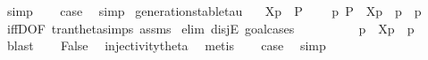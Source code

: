 \begin{isabellebody}
\ simp\isanewline
\ \ \isamarkupfalse%
\ {\isacharquery}{\kern0pt}case\ \isamarkupfalse%
\ simp\isanewline
{}\isamarkupfalse%
%
\endisatagproof
{\isafoldproof}%
%
\isadelimproof
\isanewline
%
\endisadelimproof
\isanewline
{}\isamarkupfalse%
\ generation{\isacharunderscore}{\kern0pt}stable{\isacharunderscore}{\kern0pt}tau{\isacharcolon}{\kern0pt}\isanewline
\ \ \ {\isacartoucheopen}{\isasymtheta}{\isacharbrackleft}{\kern0pt}X{\isacharbrackright}{\kern0pt}{\isacharparenleft}{\kern0pt}p{\isacharparenright}{\kern0pt}\ {\isasymlongmapsto}\isactrlsup {\isasymtheta}{\isasymtau}\ P{\isacharprime}{\kern0pt}{\isacartoucheclose}\isanewline
\ \ \ {\isacartoucheopen}{\isasymexists}\ p{\isacharprime}{\kern0pt}{\isachardot}{\kern0pt}\ P{\isacharprime}{\kern0pt}\ {\isacharequal}{\kern0pt}\ {\isasymtheta}{\isacharbrackleft}{\kern0pt}X{\isacharbrackright}{\kern0pt}{\isacharparenleft}{\kern0pt}p{\isacharprime}{\kern0pt}{\isacharparenright}{\kern0pt}\ {\isasymand}\ p\ {\isasymlongmapsto}{\isasymtau}\ p{\isacharprime}{\kern0pt}{\isacartoucheclose}\isanewline
%
\isadelimproof
\ \ %
\endisadelimproof
%
\isatagproof
{}\isamarkupfalse%
\ iffD{}{\isacharbrackleft}{\kern0pt}OF\ tran{\isacharunderscore}{\kern0pt}theta{\isachardot}{\kern0pt}simps\ assms{\isacharbrackright}{\kern0pt}\isanewline
{}\isamarkupfalse%
\ {\isacharparenleft}{\kern0pt}elim\ disjE{\isacharcomma}{\kern0pt}\ goal{\isacharunderscore}{\kern0pt}cases{\isacharparenright}{\kern0pt}\isanewline
\ \ \isamarkupfalse%
\ {}\isanewline
\ \ \isamarkupfalse%
\ \isamarkupfalse%
\ p{\isacharprime}{\kern0pt}\ \ {\isacartoucheopen}{\isasymtheta}{\isacharbrackleft}{\kern0pt}X{\isacharbrackright}{\kern0pt}{\isacharparenleft}{\kern0pt}p{\isacharparenright}{\kern0pt}\ {\isacharequal}{\kern0pt}\ {\isasymtheta}{\isacharparenleft}{\kern0pt}p{\isacharprime}{\kern0pt}{\isacharparenright}{\kern0pt}{\isacartoucheclose}\ \isamarkupfalse%
\ blast\isanewline
\ \ \isamarkupfalse%
\ False\ \isamarkupfalse%
\ injectivity{\isacharunderscore}{\kern0pt}theta{\isacharparenleft}{\kern0pt}{}{\isacharparenright}{\kern0pt}\ \isamarkupfalse%
\ metis\isanewline
\ \ \isamarkupfalse%
\ {\isacharquery}{\kern0pt}case\ \isamarkupfalse%
\ simp\isanewline
{}\isamarkupfalse%
\isanewline
\ \ \isamarkupfalse%

\end{isabellebody}
